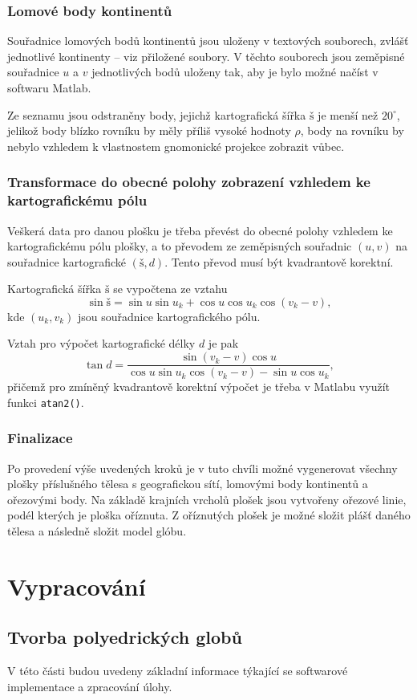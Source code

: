 \documentclass[12pt]{article}
\begin{document}
{\subsubsection {Lomové body kontinentů}} 
Souřadnice lomových bodů kontinentů jsou uloženy v textových souborech, zvlášť jednotlivé kontinenty -- viz přiložené soubory. V těchto souborech jsou zeměpisné souřadnice $u$ a $v$ jednotlivých bodů uloženy tak, aby je bylo možné načíst v softwaru Matlab.

Ze seznamu jsou odstraněny body, jejichž kartografická šířka $\text{š}$ je menší než $20^\circ$, jelikož body blízko rovníku by měly příliš vysoké hodnoty $\rho$, body na rovníku by nebylo vzhledem k vlastnostem gnomonické projekce zobrazit vůbec.

{\subsubsection{Transformace do obecné polohy zobrazení vzhledem ke kartografickému pólu}}
Veškerá data pro danou plošku je třeba převést do obecné polohy vzhledem ke kartografickému pólu plošky, a to převodem ze zeměpisných souřadnic $(u, v)$ na souřadnice kartografické $(\text{š}, d)$. Tento převod musí být kvadrantově korektní.

Kartografická šířka $\text{š}$ se vypočtena ze vztahu
\[
    \sin \text{š} = \sin u \sin u_k + \cos u \cos u_k \cos(v_k - v),
\]
kde $(u_k, v_k)$ jsou souřadnice kartografického pólu.

Vztah pro výpočet kartografické délky $d$ je pak
\[
    \tan d = \frac{\sin(v_k - v) \cos u}{\cos u \sin u_k \cos(v_k - v) - \sin u \cos u_k},
\]
přičemž pro zmíněný kvadrantově korektní výpočet je třeba v Matlabu využít funkci \texttt{atan2()}.

{\subsubsection {Finalizace}}
Po provedení výše uvedených kroků je v tuto chvíli možné vygenerovat všechny plošky příslušného tělesa s geografickou sítí, lomovými body kontinentů a ořezovými body. Na základě krajních vrcholů plošek jsou vytvořeny ořezové linie, podél kterých je ploška oříznuta. Z oříznutých plošek je možné složit plášť daného tělesa a následně složit model glóbu. 
\newpage        

{\section {Vypracování}}
{\subsection {Tvorba polyedrických globů}}
V této části budou uvedeny základní informace týkající se softwarové implementace a zpracování úlohy.
\end{document}
